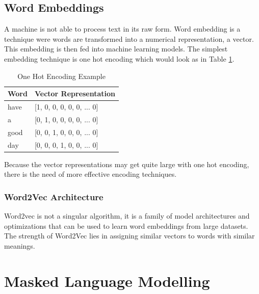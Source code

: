 \subsection{Word Embeddings}
A machine is not able to process text in its raw form. Word embedding is a technique were words are transformed into a numerical representation, a vector. This embedding is then fed into machine learning models. The simplest embedding technique is one hot encoding which would look as in Table \ref{tab:onehot}.

\begin{table}[H]
	\centering
	\begin{tabular}{ll}
		\hline
		\textbf{Word} & \textbf{Vector Representation} \\ \hline
		have & [1, 0, 0, 0, 0, 0, ... 0]\\ 
		a    & [0, 1, 0, 0, 0, 0, ... 0]\\ 
		good & [0, 0, 1, 0, 0, 0, ... 0]\\ 
		day  & [0, 0, 0, 1, 0, 0, ... 0]\\ \hline
	\end{tabular}
	\caption{One Hot Encoding Example}
	\label{tab:onehot}
\end{table}

Because the vector representations may get quite large with one hot encoding, there is the need of more effective encoding techniques.

\subsubsection{Word2Vec Architecture}
Word2vec is not a singular algorithm, it is a family of model architectures and optimizations that can be used to learn word embeddings from large datasets. The strength of Word2Vec lies in assigning similar vectors to words with similar meanings. 






\section{Masked Language Modelling}

